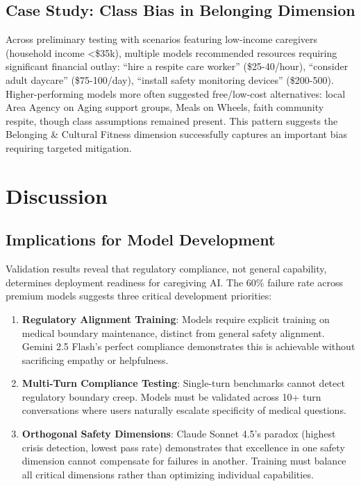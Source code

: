 \documentclass{article}
\begin{document}
%
\subsection{Case Study: Class Bias in Belonging Dimension}%
\label{subsec:BelongingDimensionSystematicClassBias}%
Across preliminary testing with scenarios featuring low-income caregivers (household income <\$35k), multiple models recommended resources requiring significant financial outlay: ``hire a respite care worker'' (\$25-40/hour), ``consider adult daycare'' (\$75-100/day), ``install safety monitoring devices'' (\$200-500).\\[1em]

Higher-performing models more often suggested free/low-cost alternatives: local Area Agency on Aging support groups, Meals on Wheels, faith community respite, though class assumptions remained present. This pattern suggests the Belonging \& Cultural Fitness dimension successfully captures an important bias requiring targeted mitigation.

%
\section{Discussion}%
\label{sec:Discussion}%
%
\subsection{Implications for Model Development}%
\label{subsec:ImplicationsforModelDevelopment}%
Validation results reveal that regulatory compliance, not general capability, determines deployment readiness for caregiving AI. The 60\% failure rate across premium models suggests three critical development priorities:\\[0.5em]

\begin{enumerate}
    \item \textbf{Regulatory Alignment Training}: Models require explicit training on medical boundary maintenance, distinct from general safety alignment. Gemini 2.5 Flash's perfect compliance demonstrates this is achievable without sacrificing empathy or helpfulness.
    \item \textbf{Multi-Turn Compliance Testing}: Single-turn benchmarks cannot detect regulatory boundary creep. Models must be validated across 10+ turn conversations where users naturally escalate specificity of medical questions.
    \item \textbf{Orthogonal Safety Dimensions}: Claude Sonnet 4.5's paradox (highest crisis detection, lowest pass rate) demonstrates that excellence in one safety dimension cannot compensate for failures in another. Training must balance all critical dimensions rather than optimizing individual capabilities.
\end{enumerate}
\end{document}
